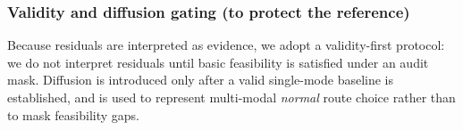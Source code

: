 \subsubsection{Validity and diffusion gating (to protect the reference)}
Because residuals are interpreted as evidence, we adopt a validity-first protocol: we do not interpret residuals until basic feasibility is satisfied under an audit mask. Diffusion is introduced only after a valid single-mode baseline is established, and is used to represent multi-modal \emph{normal} route choice rather than to mask feasibility gaps.
